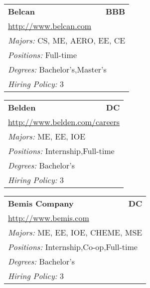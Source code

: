 \documentclass[twoside]{article}
\begin{document}
\begin{center}
\begin{multicols}{3}
\begin{FlushLeft}
\begin{minipage}{.9\columnwidth}
\end{minipage}
 
\begin{minipage}{.9\columnwidth}\begin{tabularx}{.95\columnwidth}{Xr}
                 {\Large\bf Belcan} & {\Large\bf BBB}\\
    \multicolumn{2}{p{.95\columnwidth}}{\url{http://www.belcan.com}}\\
    \multicolumn{2}{p{.95\columnwidth}}{\emph{Majors:} CS, ME, AERO, EE, CE}\\
    \multicolumn{2}{p{.95\columnwidth}}{\emph{Positions:} Full-time}\\
    \multicolumn{2}{p{.95\columnwidth}}{\emph{Degrees:} Bachelor's,Master's}\\
    \multicolumn{2}{p{.95\columnwidth}}{\emph{Hiring Policy:} 3}\\
    \end{tabularx}
    
\end{minipage}
 
\begin{minipage}{.9\columnwidth}\begin{tabularx}{.95\columnwidth}{Xr}
                 {\Large\bf Belden} & {\Large\bf DC}\\
    \multicolumn{2}{p{.95\columnwidth}}{\url{http://www.belden.com/careers}}\\
    \multicolumn{2}{p{.95\columnwidth}}{\emph{Majors:} ME, EE, IOE}\\
    \multicolumn{2}{p{.95\columnwidth}}{\emph{Positions:} Internship,Full-time}\\
    \multicolumn{2}{p{.95\columnwidth}}{\emph{Degrees:} Bachelor's}\\
    \multicolumn{2}{p{.95\columnwidth}}{\emph{Hiring Policy:} 3}\\
    \end{tabularx}
    
\end{minipage}
 
\begin{minipage}{.9\columnwidth}\begin{tabularx}{.95\columnwidth}{Xr}
                 {\Large\bf Bemis Company} & {\Large\bf DC}\\
    \multicolumn{2}{p{.95\columnwidth}}{\url{http://www.bemis.com}}\\
    \multicolumn{2}{p{.95\columnwidth}}{\emph{Majors:} ME, EE, IOE, CHEME, MSE}\\
    \multicolumn{2}{p{.95\columnwidth}}{\emph{Positions:} Internship,Co-op,Full-time}\\
    \multicolumn{2}{p{.95\columnwidth}}{\emph{Degrees:} Bachelor's}\\
    \multicolumn{2}{p{.95\columnwidth}}{\emph{Hiring Policy:} 3}\\
    \end{tabularx}
    

\end{minipage}
\end{FlushLeft}
\end{multicols}
\end{center}
\end{document}
